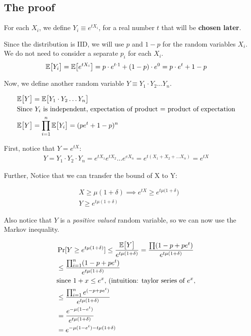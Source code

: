 \subsection{The proof}
For each $X_i$, we define $Y_i \equiv e^{t X_i}$, for a real number $t$
that will be \textbf{chosen later}.


Since the distribution is IID, we will use $p$ and $1 - p$ for the random
variables $X_i$. We do not need to consider a separate $p_i$ for each $X_i$.
\begin{align*}
\mathbb{E}\big[ Y_i \big] = \mathbb{E}\big[ e^{t X_i}  \big] = p \cdot e^{t \cdot 1} + (1 - p) \cdot e^0 =
p \cdot e^t + 1 - p
\end{align*}


Now, we define another random variable $Y \equiv Y_1 \cdot Y_2 \dots Y_n$.

\begin{align*}
&\mathbb{E}\big[ Y \big] = \mathbb{E}\big[ Y_1 \cdot Y_2 \dots Y_n \big]  \\
&\text{Since $Y_i$ is independent, expectation of product = product of expectation} \\
&\mathbb{E}\big[ Y \big] = \prod_{i=1}^n \mathbb{E}\big[ Y_i \big] = (p e^t + 1 - p)^n
\end{align*}

First, notice that $Y = e^{tX}$:
\begin{align*}
Y = Y_1 \cdot Y_2 \cdot Y_n = e^{tX_1} e^{t X_2} \dots e^{e X_n} = e^{t(X_1 + X_2 + \dots X_n)} = e^{tX}
\end{align*}

Further, Notice that we can transfer the bound of X to Y:

\begin{align*}
&X \geq \mu(1 + \delta) \implies e^{tX} \geq e^{t \mu(1 + \delta}) \\
&Y \geq e^{t \mu (1 + \delta)}
\end{align*}

Also notice that $Y$ is a \textit{positive valued} random variable, so we can
now use the Markov inequality.

\begin{align*}
&\Pr[Y \geq e^{t \mu (1 + \delta)}] \leq \frac{\E{Y}}{e^{t \mu (1 + \delta)}} =
\frac{\prod (1 - p + pe^t)}{e^{t \mu (1 + \delta)}} \\
%
&\leq \frac{\prod_{i=1}^n (1 - p + pe^t)}{e^{t \mu (1 + \delta)}} \\
%
&\text{since $1 + x \leq e^x$, (intuition: taylor series of $e^x$}, \\
%
&\leq \frac{\prod_{i=1}^n e^{(- p + pe^t)}}{e^{t \mu (1 + \delta)}} \\
%
&= \frac{e^{-\mu (1 - e^t)}}{e^{t \mu (1 + \delta)}} \\
%
&= e^{-\mu (1 - e^t) - t\mu(1 + \delta)} \\
%
\end{align*}


